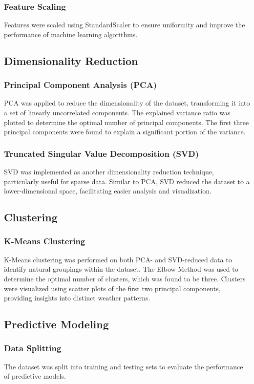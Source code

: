 \documentclass[12pt]{article}
\begin{document}
\subsubsection{Feature Scaling}
Features were scaled using StandardScaler to ensure uniformity and improve the performance of machine learning algorithms.

\subsection{Dimensionality Reduction}
\subsubsection{Principal Component Analysis (PCA)}
PCA was applied to reduce the dimensionality of the dataset, transforming it into a set of linearly uncorrelated components. The explained variance ratio was plotted to determine the optimal number of principal components. The first three principal components were found to explain a significant portion of the variance.

\subsubsection{Truncated Singular Value Decomposition (SVD)}
SVD was implemented as another dimensionality reduction technique, particularly useful for sparse data. Similar to PCA, SVD reduced the dataset to a lower-dimensional space, facilitating easier analysis and visualization.

\subsection{Clustering}
\subsubsection{K-Means Clustering}
K-Means clustering was performed on both PCA- and SVD-reduced data to identify natural groupings within the dataset. The Elbow Method was used to determine the optimal number of clusters, which was found to be three. Clusters were visualized using scatter plots of the first two principal components, providing insights into distinct weather patterns.

\subsection{Predictive Modeling}
\subsubsection{Data Splitting}
The dataset was split into training and testing sets to evaluate the performance of predictive models.
\end{document}
